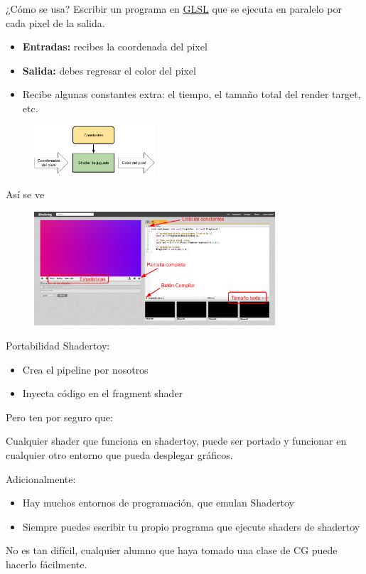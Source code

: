\begin{frame}{¿Cómo se usa?}
Escribir un programa en \href{https://www.khronos.org/opengl/wiki/Core_Language_(GLSL)}{GLSL} que se ejecuta en paralelo por cada pixel de la salida.
\begin{itemize}
    \item \textbf{Entradas:} recibes la coordenada del pixel
    \item \textbf{Salida:} debes regresar el color del pixel
    \item Recibe algunas constantes extra: el tiempo, el tamaño total del render target, etc.
\end{itemize}
\begin{figure}[htp]
  \centering
  \includegraphics[width=0.4\textwidth]{img/SimpleShaderToy}
\end{figure}
\end{frame}

\begin{frame}{Así se ve}
\begin{figure}[htp]
  \centering
  \includegraphics[width=0.8\textwidth]{img/ShaderToyUI}
\end{figure}
\end{frame}

\begin{frame}{Portabilidad}
Shadertoy:
\begin{itemize}
    \item Crea el pipeline por nosotros
    \item Inyecta código en el fragment shader
\end{itemize}
Pero ten por seguro que:
\begin{block}{}
    Cualquier shader que funciona en shadertoy, puede ser \alert{portado} y funcionar en cualquier otro entorno que pueda desplegar gráficos.
\end{block}
Adicionalmente:
\begin{itemize}{}
    \item Hay muchos entornos de programación, que emulan Shadertoy
    \item Siempre puedes escribir tu propio programa que ejecute shaders de shadertoy
\end{itemize}
\begin{block}{}
    No es tan difícil, cualquier alumno que haya tomado una clase de CG puede hacerlo fácilmente.
\end{block}
\end{frame}
